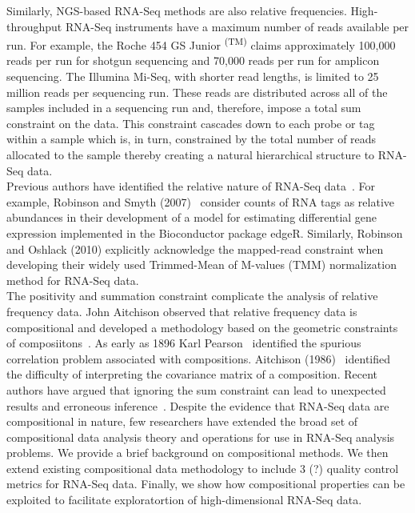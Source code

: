 \documentclass{article}\usepackage[]{graphicx}\usepackage[]{color}
\theoremstyle{definition}
\begin{document}

Similarly, NGS-based RNA-Seq methods are also relative frequencies.  High-throughput RNA-Seq instruments have a maximum number of reads available per run.  For example, the Roche 454 GS Junior \textsuperscript{(TM)} claims approximately 100,000 reads per run for shotgun sequencing and 70,000 reads per run for amplicon sequencing.  The Illumina Mi-Seq, with shorter read lengths, is limited to 25 million reads per sequencing run.  These reads are distributed across all of the samples included in a sequencing run and, therefore, impose a total sum constraint on the data.  This constraint cascades down to each probe or tag within a sample which is, in turn, constrained by the total number of reads allocated to the sample thereby creating a natural hierarchical structure to RNA-Seq data.\\

Previous authors have identified the relative nature of RNA-Seq data~\cite{Robinson2007, Anders2010, Robinson2010, Law2014, Lovell2015}.  For example, Robinson and Smyth (2007)~\cite{Robinson2007} consider counts of RNA tags as relative abundances in their development of a model for estimating differential gene expression implemented in the Bioconductor package edgeR.  Similarly, Robinson and Oshlack (2010) explicitly acknowledge the mapped-read constraint when developing their widely used Trimmed-Mean of M-values (TMM) normalization method for RNA-Seq data.  \\%


The positivity and summation constraint complicate the analysis of relative frequency data.  John Aitchison observed that relative frequency data is compositional and developed a methodology based on the geometric constraints of composiitons~\cite{Aitchison1986}.  As early as 1896 Karl Pearson~\cite{Pearson1896} identified the spurious correlation problem associated with compositions.  Aitchison (1986)~\cite{Aitchison1986} identified the difficulty of interpreting the covariance matrix of a composition.  Recent authors have argued that ignoring the sum constraint can lead to unexpected results and erroneous inference~\cite{Lovell2011}.  Despite the evidence that RNA-Seq data are compositional in nature, few researchers have extended the broad set of compositional data analysis theory and operations for use in RNA-Seq analysis problems.  We provide a brief background on compositional methods.  We then extend existing compositional data methodology to include 3 (?) quality control metrics for RNA-Seq data. Finally, we show how compositional properties can be exploited to facilitate exploratortion of high-dimensional RNA-Seq data.\\
\end{document}
